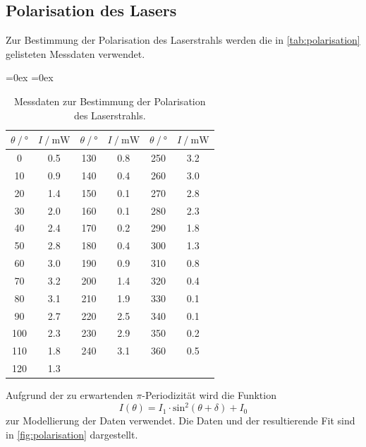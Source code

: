 \subsection{Polarisation des Lasers}
Zur Bestimmung der Polarisation des Laserstrahls werden die in \autoref{tab:polarisation} gelisteten Messdaten verwendet.
\begin{table}
  \centering
  \aboverulesep=0ex %
  \belowrulesep=0ex %
  \caption{Messdaten zur Bestimmung der Polarisation des Laserstrahls.}
  \label{tab:polarisation}
  \begin{tabular}{S[table-format = 3.0] S[table-format = 1.1] | S[table-format = 3.0] S[table-format = 1.1] | S[table-format = 3.0] S[table-format = 1.1]}
    {$\theta \mathbin{/} \unit{\degree}$} & {$I \mathbin{/} \unit{\milli\watt}$} & {$\theta \mathbin{/} \unit{\degree}$} & {$I \mathbin{/} \unit{\milli\watt}$} &%
    {$\theta \mathbin{/} \unit{\degree}$} & {$I \mathbin{/} \unit{\milli\watt}$} \\
    \midrule
    \rule{0pt}{1.1EM}
      0 & 0.5 & 130 & 0.8 & 250 & 3.2 \\
     10 & 0.9 & 140 & 0.4 & 260 & 3.0 \\
     20 & 1.4 & 150 & 0.1 & 270 & 2.8 \\
     30 & 2.0 & 160 & 0.1 & 280 & 2.3 \\
     40 & 2.4 & 170 & 0.2 & 290 & 1.8 \\
     50 & 2.8 & 180 & 0.4 & 300 & 1.3 \\
     60 & 3.0 & 190 & 0.9 & 310 & 0.8 \\
     70 & 3.2 & 200 & 1.4 & 320 & 0.4 \\
     80 & 3.1 & 210 & 1.9 & 330 & 0.1 \\
     90 & 2.7 & 220 & 2.5 & 340 & 0.1 \\
    100 & 2.3 & 230 & 2.9 & 350 & 0.2 \\
    110 & 1.8 & 240 & 3.1 & 360 & 0.5 \\
    120 & 1.3 &     &     &     &     \\
  \end{tabular}
\end{table}
Aufgrund der zu erwartenden $\pi$-Periodizität wird die Funktion 
\begin{equation*}
  I(\theta) = I_1 \cdot \text{sin}^2\left(\theta + \delta \right) + I_0
\end{equation*}
zur Modellierung der Daten verwendet. Die Daten und der resultierende Fit sind in \autoref{fig:polarisation} dargestellt.
